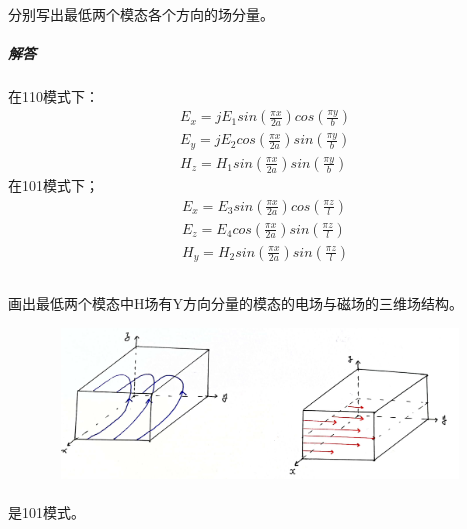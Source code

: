 \documentclass[UTF8]{ctexart}
\begin{document}
\paragraph{}
分别写出最低两个模态各个方向的场分量。
\subparagraph{解答}
在110模式下：
\begin{equation*}
\begin{aligned}
&E_x=jE_1sin(\frac{\pi x}{2a})cos(\frac{\pi y}{b})\\
&E_y=jE_2cos(\frac{\pi x}{2a})sin(\frac{\pi y}{b})\\
&H_z=H_1sin(\frac{\pi x}{2a})sin(\frac{\pi y}{b})
\end{aligned}
\end{equation*}
在101模式下；
\begin{equation*}
\begin{aligned}
&E_x=E_3sin(\frac{\pi x}{2a})cos(\frac{\pi z}{l})\\
&E_z=E_4cos(\frac{\pi x}{2a})sin(\frac{\pi z}{l})\\
&H_y=H_2sin(\frac{\pi x}{2a})sin(\frac{\pi z}{l})
\end{aligned}
\end{equation*} 
\subsection{}
\paragraph{}
画出最低两个模态中H场有Y方向分量的模态的电场与磁场的三维场结构。
\begin{figure}[htbp]
\centering
\includegraphics[width=14cm,height=4cm]{2019-5.jpg}
\end{figure}
\paragraph{}
是101模式。
\end{document}
